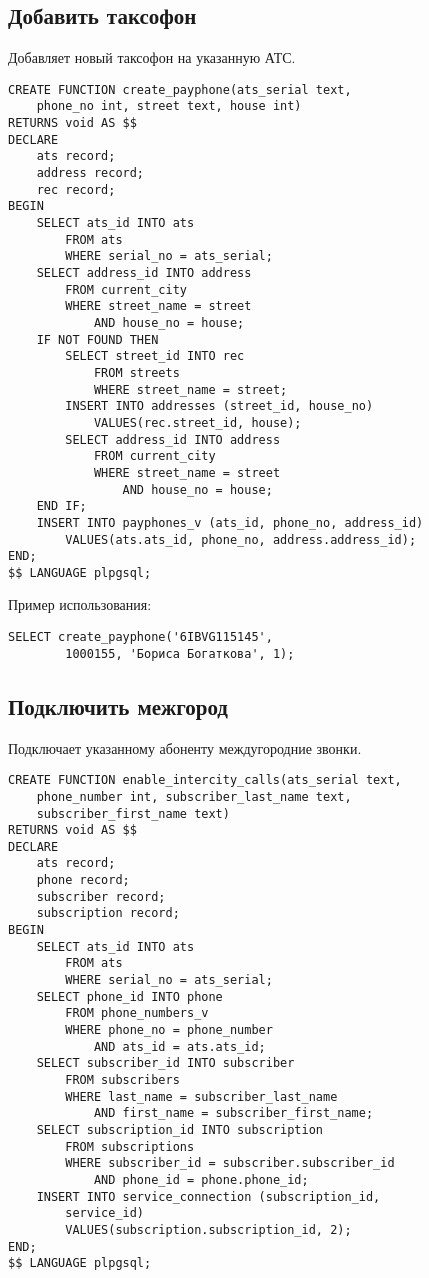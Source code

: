 \documentclass{report}
\begin{document}
\subsection*{Добавить таксофон}

Добавляет новый таксофон на указанную АТС.

\begin{lstlisting}
CREATE FUNCTION create_payphone(ats_serial text, 
    phone_no int, street text, house int) 
RETURNS void AS $$
DECLARE
    ats record;
    address record;
    rec record;
BEGIN
    SELECT ats_id INTO ats 
        FROM ats 
        WHERE serial_no = ats_serial;
    SELECT address_id INTO address
        FROM current_city
        WHERE street_name = street
            AND house_no = house;
    IF NOT FOUND THEN
        SELECT street_id INTO rec 
            FROM streets 
            WHERE street_name = street;
        INSERT INTO addresses (street_id, house_no)
            VALUES(rec.street_id, house);
        SELECT address_id INTO address
            FROM current_city
            WHERE street_name = street
                AND house_no = house;
    END IF;
    INSERT INTO payphones_v (ats_id, phone_no, address_id)
        VALUES(ats.ats_id, phone_no, address.address_id);
END;
$$ LANGUAGE plpgsql;
\end{lstlisting}

Пример использования:
\begin{lstlisting}
SELECT create_payphone('6IBVG115145',
        1000155, 'Бориса Богаткова', 1);
\end{lstlisting}

\subsection*{Подключить межгород}

Подключает указанному абоненту междугородние звонки.

\begin{lstlisting}
CREATE FUNCTION enable_intercity_calls(ats_serial text, 
    phone_number int, subscriber_last_name text, 
    subscriber_first_name text) 
RETURNS void AS $$
DECLARE
    ats record;
    phone record;
    subscriber record;
    subscription record;
BEGIN
    SELECT ats_id INTO ats 
        FROM ats 
        WHERE serial_no = ats_serial;
    SELECT phone_id INTO phone
        FROM phone_numbers_v
        WHERE phone_no = phone_number
            AND ats_id = ats.ats_id;
    SELECT subscriber_id INTO subscriber
        FROM subscribers
        WHERE last_name = subscriber_last_name
            AND first_name = subscriber_first_name;
    SELECT subscription_id INTO subscription
        FROM subscriptions
        WHERE subscriber_id = subscriber.subscriber_id
            AND phone_id = phone.phone_id;
    INSERT INTO service_connection (subscription_id, 
        service_id)
        VALUES(subscription.subscription_id, 2);
END;
$$ LANGUAGE plpgsql;
\end{lstlisting}
\end{document}
